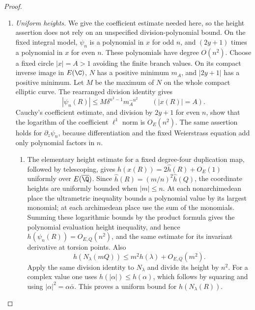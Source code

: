 \begin{proof}
\begin{enumerate}[label=\arabic*.,leftmargin=0pt,labelsep=.5em]
\begin{enumerate}[label={$\langle2\rangle$\arabic*.},leftmargin=1.3em,labelsep=.5em]
 
\end{enumerate}

\item \emph{Uniform heights.}
We give the coefficient estimate needed here, so the height
assertion does not rely on an unspecified division-polynomial
bound.  On the fixed integral model, $\psi_n$ is a polynomial
in $x$ for odd $n$, and $(2y+1)$ times a polynomial in $x$
for even $n$.  These polynomials have degree $O(n^2)$.
Choose a fixed circle $|x|=A>1$ avoiding the finite branch values.
On its compact inverse image in $E(\C)$, $N$ has a positive
minimum $m_A$, and $|2y+1|$ has a positive minimum.  Let $M$
be the maximum of $N$ on the whole compact elliptic curve.
The rearranged division identity gives
\[
 |\psi_n(R)|\leq M\delta^{n^2-1}m_A^{-n^2}
       \qquad(|x(R)|=A).
\]
Cauchy's coefficient estimate, and division by $2y+1$ for
even $n$, show that the logarithm of the coefficient
$\ell^1$ norm is $O_E(n^2)$.  The same assertion holds for
$\partial_z\psi_n$, because differentiation and the fixed
Weierstrass equation add only polynomial factors in $n$.


\begin{enumerate}[label={$\langle2\rangle$\arabic*.},leftmargin=1.3em,labelsep=.5em]
\item  The elementary height estimate for a fixed degree-four
duplication map, followed by telescoping, gives
$h(x(R))=2\widehat h(R)+O_E(1)$ uniformly over
$E(\overline\Q)$.  Since
$\widehat h(R)=(m/n)^2\widehat h(Q)$, the coordinate heights
are uniformly bounded when $|m|\leq n$.
At each nonarchimedean place the ultrametric inequality bounds a
polynomial value by its largest monomial; at each archimedean
place use the sum of the monomials. Summing these logarithmic
bounds by the product formula gives the polynomial evaluation
height inequality, and hence
$h(\psi_n(R))=O_{E,Q}(n^2)$, and the same estimate for its
invariant derivative at torsion points.  Also
\[
 h(N_\lambda(mQ))\leq m^2h(\lambda)+O_{E,Q}(m^2).
\]
Apply the same division identity to $N_\lambda$ and divide its height by $n^2$.
For a complex value one uses
$h(|\alpha|)\leq h(\alpha)$, which follows by squaring and
using $|\alpha|^2=\alpha\bar\alpha$.
This proves a uniform bound for $h(N_\lambda(R))$.

 
\end{enumerate}


\end{enumerate}
\end{proof}
